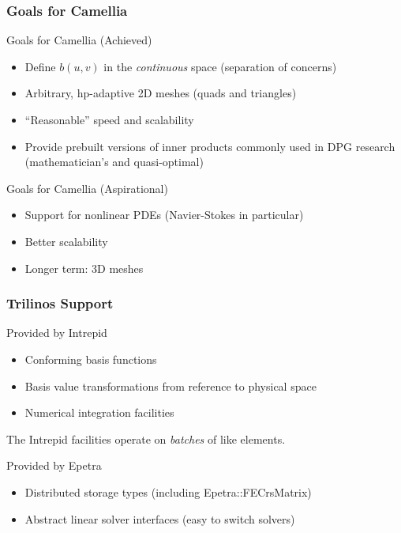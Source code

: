 \documentclass[mathserif]{beamer}
\begin{document}
\begin{frame}
\frametitle{Goals for Camellia}
\begin{block}{Goals for Camellia (Achieved)}
\begin{itemize}
\item Define $b(u,v)$ in the \emph{continuous} space (separation of concerns)
\item Arbitrary, hp-adaptive 2D meshes (quads and triangles)
\item ``Reasonable'' speed and scalability
\item Provide prebuilt versions of inner products commonly used in DPG research (mathematician's and quasi-optimal)
\end{itemize}
\end{block}

\vspace{3 mm}

\begin{block}{Goals for Camellia (Aspirational)}
\begin{itemize}
\item Support for nonlinear PDEs (Navier-Stokes in particular)
\item Better scalability
\item Longer term: 3D meshes
\end{itemize}
\end{block}

\end{frame}


\begin{frame}
\frametitle{Trilinos Support}
\begin{block}{Provided by Intrepid}
\begin{itemize}
\item Conforming basis functions 
\item Basis value transformations from reference to physical space
\item Numerical integration facilities
\end{itemize}
\end{block}

The Intrepid facilities operate on \emph{batches} of like elements.

\vspace{3 mm}

\begin{block}{Provided by Epetra}
\begin{itemize}
\item Distributed storage types (including Epetra::FECrsMatrix)
\item Abstract linear solver interfaces (easy to switch solvers)
\end{itemize}
\end{block}

\end{frame}
\end{document}
